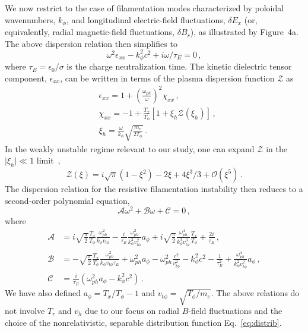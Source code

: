 \documentclass[aps,superscriptaddress]{revtex4}
\begin{document}
We now restrict to the case of filamentation modes characterized by poloidal wavenumbers, $k_\phi$, and longitudinal electric-field fluctuations, $\delta E_x$ (or, equivalently, radial magnetic-field fluctuations, $\delta B_r$), as illustrated by Figure~4a. The above dispersion relation then simplifies to
\begin{equation}\label{eq:dispe}
\omega^2 \epsilon_{xx} - k_\phi^2c^2 +i\omega/\tau_E = 0 \,,
\end{equation}
where $\tau_E=\epsilon_0/\sigma$ is the charge neutralization time. The kinetic dielectric tensor component, $\epsilon_{xx}$, can be written in terms of the plasma dispersion function $\mathcal{Z}$ as~\cite{POP_Ruyer_2015} 
\begin{align}
    &\epsilon_{xx} = 1 +\left(\frac{\omega_{ph}}{\omega}\right)^2 \chi_{xx}\,,\\ 
    &\chi_{xx} = -1 + \frac{T_x}{T_\phi}\left[ 1+\xi_h \mathcal{Z}(\xi_h) \right] \,,\\
    &\xi_h = \frac{\omega}{k_\phi} \sqrt{\frac{m_e}{2T_\phi}} \,.
\end{align}
In the weakly unstable regime relevant to our study, one can expand $\mathcal{Z}$ in the $\vert \xi_h \vert \ll 1$ limit~\cite{NRL_Huba_2013},
\begin{equation}
    \mathcal{Z}(\xi) = i \sqrt{\pi}(1-\xi^2) - 2\xi +4\xi^3/3 + \mathcal{O}(\xi^5) \,.
\end{equation}
The dispersion relation for the resistive filamentation instability then reduces to a second-order polynomial equation,
\begin{equation}
  \mathcal{A}\omega^2 +\mathcal{B}\omega +\mathcal{C} = 0\,,
\label{eq:dispepoloidal}
\end{equation}
where
\begin{align}
\mathcal{A}& = i\sqrt{\frac{\pi}{2}}\frac{T_x}{T_\phi} \frac{\omega_{ph}^2}{k_\phi v_{t\phi}} -\frac{i}{\tau_E}\frac{\omega_{ph}^2}{k_\phi^2 v_{t\phi}^2} a_\phi 
+i\sqrt{\frac{\pi}{2}}\frac{\omega_{ph}^4}{k_\phi^3 v_{t\phi}^3} \frac{T_x }{T_\phi} + \frac{2i}{\tau_E} \label{eq:a} \,, \\
\mathcal{B} & = -\sqrt{\frac{\pi}{2}}\frac{T_x}{T_\phi}\frac{\omega_{ph}^2}{k_\phi v_{t\phi} \tau_E}
+\omega_{ph}^2 a_\phi-\omega_{ph}^2 \frac{c^2}{v_{t\phi}^2} -k_\phi^2 c^2 -\frac{1}{\tau_E^2} + \frac{\omega_{ph}^4}{k_\phi^2 v_{t\phi}^2}a_\phi \,, \label{eq:b} \\
\mathcal{C} & =\frac{i}{\tau_E}(\omega_{ph}^2 a_\phi -k_\phi^2c^2 )\label{eq:c} \,.
\end{align}
We have also defined $a_\phi=T_x/T_\phi-1$ and $v_{t\phi}=\sqrt{T_\phi/m_e}$. The above relations do not involve $T_r$ and $v_h$ due to our focus on radial $B$-field fluctuations and the choice of the nonrelativistic, separable distribution function Eq.~\eqref{eq:distrib}. 
\end{document}
